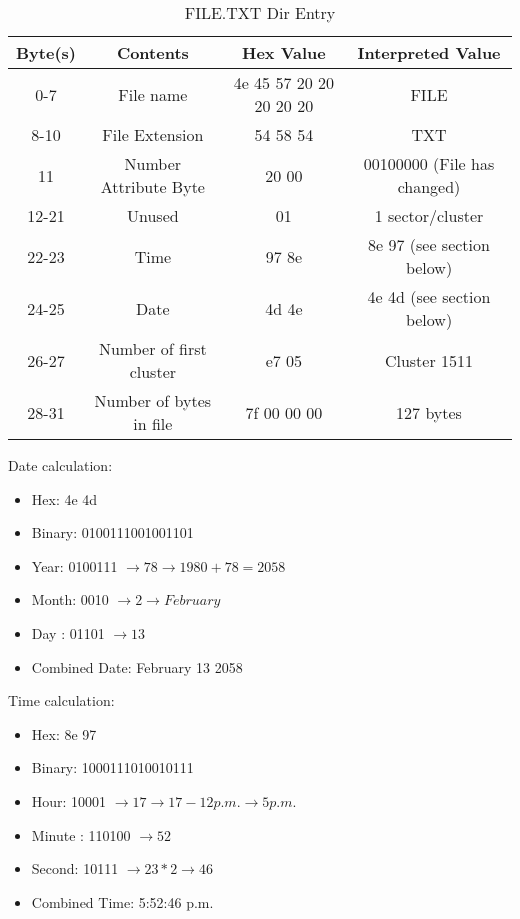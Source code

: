 \documentclass{article}
\begin{document}
    \begin{table}[h]
        \centering
        \begin{tabular}{|c|c|c|c|}
            \hline
                Byte(s) & Contents & Hex Value & Interpreted Value\\
            \hline
                0-7 & File name &
                     4e 45 57 20 20 20 20 20   &
                     FILE    \\
                8-10 & File Extension &
                    54 58 54 &
                    TXT \\
                11 & Number Attribute Byte &
                     20 00 &
                     00100000 (File has changed) \\
                12-21 & Unused &
                    01  &
                    1 sector/cluster\\
                22-23 & Time &
                    97 8e &
                    8e 97 (see section below) \\
                24-25 & Date &
                    4d 4e &
                     4e 4d (see section below)\\
                26-27 & Number of first cluster &
                    e7 05 &
                    Cluster 1511 \\
                28-31 & Number of bytes in file &
                    7f 00  00  00 &
                    127 bytes \\
            \hline
    \end{tabular}
    \caption{FILE.TXT Dir Entry}
    \label{tab:basic}
    \end{table}

    Date calculation:

    \begin{itemize}
        \item Hex: 4e 4d
        \item Binary: 0100111001001101
        \item Year: 0100111 $\rightarrow 78 \rightarrow 1980 + 78 = 2058$
        \item Month: 0010 $\rightarrow 2 \rightarrow February$
        \item Day : 01101 $\rightarrow 13$
        \item Combined Date: February 13 2058
    \end{itemize}

    Time calculation:
    \begin{itemize}
        \item Hex: 8e 97
        \item Binary: 1000111010010111
        \item Hour: 10001 $\rightarrow 17 \rightarrow 17 - 12 p.m. \rightarrow 5 p.m.$
        \item Minute : 110100 $\rightarrow 52$
        \item Second: 10111 $\rightarrow 23 * 2 \rightarrow 46$
        \item Combined Time: 5:52:46 p.m.
    \end{itemize}
\end{document}
